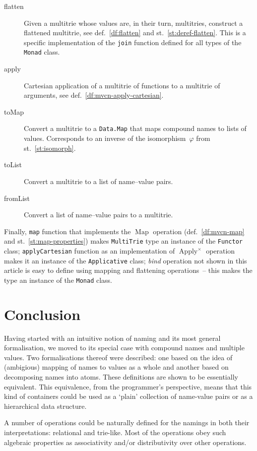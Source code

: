 \documentclass{article}
\theoremstyle{definition}
\newcommand{\fmap}{\operatorname{Map}}
\newcommand{\apply}{\operatorname{Apply}}
\begin{document}
\begin{description}
\item [flatten]
  Given a multitrie whose values are, in their turn, multitries, construct
  a flattened multitrie, see def.~\ref{df:flatten} and
  st.~\ref{st:deref-flatten}. This is a specific implementation of the
  \lstinline{join} function defined for all types of the \lstinline{Monad}
  class.
\item [apply]
  Cartesian
  application of a multitrie of functions to a multitrie of arguments, see
  def.~\ref{df:mvcn-apply-cartesian}.
\item [toMap]
  Convert a multitrie to a \lstinline{Data.Map} that maps compound names to
  lists of values. Corresponds to an inverse of the isomorphism~$\varphi$
  from st.~\ref{st:isomorph}.
\item [toList]
  Convert a multitrie to a list of name--value pairs.
\item [fromList]
  Convert a list of name--value pairs to a multitrie.
\end{description}

Finally, \lstinline{map} function that implements the $\fmap$ operation
(def.~\ref{df:mvcn-map} and st.~\ref{st:map-properties})
makes \lstinline{MultiTrie} type an instance of the \lstinline{Functor} class; 
\lstinline{applyCartesian} function as an implementation of $\apply^{\times}$
operation makes it an instance of the \lstinline{Applicative} class; 
\emph{bind} operation not shown in this article is easy to define using mapping
and flattening operations~-- this makes the type an instance of the
\lstinline{Monad} class.



\section{Conclusion}

Having started with an intuitive notion of naming and its most general
formalisation, we moved to its special case with compound names and multiple
values. Two formalisations thereof were described: one based on the idea of
(ambigious) mapping of names to values as a whole and another based on
decomposing names into atoms. These definitions are shown to be essentially
equivalent. This equivalence, from the programmer's perspective, means that
this kind of containers could be used as a `plain' collection of name-value
pairs or as a hierarchical data structure.

A number of operations could be naturally defined for the namings in both
their interpretations: relational and trie-like. Most of the operations obey
such algebraic properties as associativity and/or distributivity over other
operations.
\end{document}
